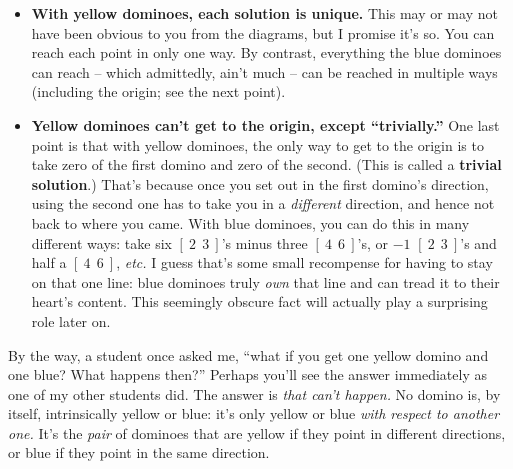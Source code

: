 \begin{itemize}
\item \textbf{With yellow dominoes, each solution is unique.} This may or may
not have been obvious to you from the diagrams, but I promise it's so. You can
reach each point in only one way. By contrast, everything the blue dominoes can
reach -- which admittedly, ain't much -- can be reached in multiple ways
(including the origin; see the next point).

\label{trivialSolution}

\item \textbf{Yellow dominoes can't get to the origin, except ``trivially.''}
One last point is that with yellow dominoes, the only way to get to the origin
is to take zero of the first domino and zero of the second. (This is called a
\textbf{trivial solution}.) That's because once you set out in the first
domino's direction, using the second one has to take you in a
\textit{different} direction, and hence not back to where you came. With blue
dominoes, you can do this in many different ways: take six $[\ 2\ \ 3\ ]$'s
minus three $[\ 4\ \ 6\ ]$'s, or $-1$ $[\ 2\ \ 3\ ]$'s and half a $[\ 4\ \ 6\
]$, \textit{etc.} I guess that's some small recompense for having to stay on
that one line: blue dominoes truly \textit{own} that line and can tread it to
their heart's content. This seemingly obscure fact will actually play a
surprising role later on.

\end{itemize}

By the way, a student once asked me, ``what if you get one yellow domino and
one blue? What happens then?'' Perhaps you'll see the answer immediately as one
of my other students did. The answer is \textit{that can't happen.} No domino
is, by itself, intrinsically yellow or blue: it's only yellow or blue
\textit{with respect to another one.} It's the \textit{pair} of dominoes that
are yellow if they point in different directions, or blue if they point in the
same direction.



